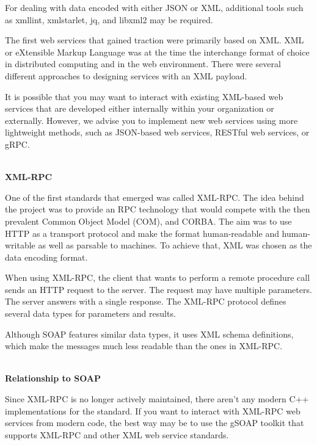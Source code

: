 For dealing with data encoded with either JSON or XML, additional tools such as xmllint, xmlstarlet, jq, and libxml2 may be required.


The first web services that gained traction were primarily based on XML. XML or eXtensible Markup Language was at the time the interchange format of choice in distributed computing and in the web environment. There were several different approaches to designing services with an XML payload.

It is possible that you may want to interact with existing XML-based web services that are developed either internally within your organization or externally. However, we advise you to implement new web services using more lightweight methods, such as JSON-based web services, RESTful web services, or gRPC.

\hspace*{\fill} \\ %
\noindent
\textbf{XML-RPC}

One of the first standards that emerged was called XML-RPC. The idea behind the project was to provide an RPC technology that would compete with the then prevalent Common Object Model (COM), and CORBA. The aim was to use HTTP as a transport protocol and make the format human-readable and human-writable as well as parsable to machines. To achieve that, XML was chosen as the data encoding format.

When using XML-RPC, the client that wants to perform a remote procedure call sends an HTTP request to the server. The request may have multiple parameters. The server answers with a single response. The XML-RPC protocol defines several data types for parameters and results.

Although SOAP features similar data types, it uses XML schema definitions, which make the messages much less readable than the ones in XML-RPC.

\hspace*{\fill} \\ %
\noindent
\textbf{Relationship to SOAP}

Since XML-RPC is no longer actively maintained, there aren't any modern C++ implementations for the standard. If you want to interact with XML-RPC web services from modern code, the best way may be to use the gSOAP toolkit that supports XML-RPC and other XML web service standards.

